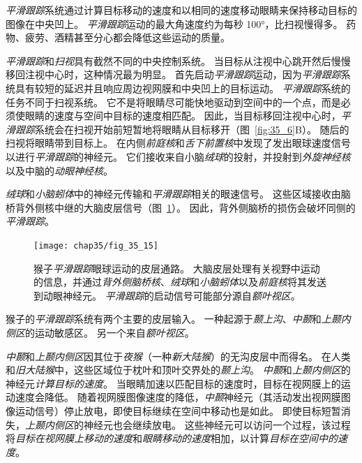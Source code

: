 \textit{平滑跟踪}系统通过计算目标移动的速度和以相同的速度移动眼睛来保持移动目标的图像在中央凹上。
\textit{平滑跟踪}运动的最大角速度约为每秒 100°，比扫视慢得多。
药物、疲劳、酒精甚至分心都会降低这些运动的质量。


\textit{平滑跟踪}和\textit{扫视}具有截然不同的中央控制系统。
当目标从注视中心跳开然后慢慢移回注视中心时，这种情况最为明显。
首先启动\textit{平滑跟踪}运动，因为\textit{平滑跟踪}系统具有较短的延迟并且响应周边视网膜和中央凹上的目标运动。
\textit{平滑跟踪}系统的任务不同于扫视系统。
它不是将眼睛尽可能快地驱动到空间中的一个点，而是必须使眼睛的速度与空间中目标的速度相匹配。
因此，当目标移回注视中心时，\textit{平滑跟踪}系统会在扫视开始前短暂地将眼睛从目标移开（图~\ref{fig:35_6}B）。
随后的扫视将眼睛带到目标上。
在内侧\textit{前庭核}和\textit{舌下前置核}中发现了发出眼球速度信号以进行\textit{平滑跟踪}的神经元。
它们接收来自小脑\textit{绒球}的投射，并投射到\textit{外旋神经核}以及中脑的\textit{动眼神经核}。


\textit{绒球}和\textit{小脑蚓体}中的神经元传输和\textit{平滑跟踪}相关的眼速信号。
这些区域接收由脑桥背外侧核中继的大脑皮层信号（图~\ref{fig:35_15}）。
因此，背外侧脑桥的损伤会破坏同侧的\textit{平滑跟踪}。


\begin{figure}[htbp]
	\centering
	\texttt{[image: chap35/fig\_35\_15]}
	\caption{猴子\textit{平滑跟踪}眼球运动的皮层通路。
		大脑皮层处理有关视野中运动的信息，并通过\textit{背外侧脑桥核}、\textit{绒球}和\textit{小脑蚓体}以及\textit{前庭核}将其发送到动眼神经元。
		\textit{平滑跟踪}的启动信号可能部分源自\textit{额叶视区}。}
	\label{fig:35_15}
\end{figure}


猴子的\textit{平滑跟踪}系统有两个主要的皮层输入。
一种起源于\textit{颞上沟}、\textit{中颞}和\textit{上颞内侧区}的运动敏感区。
另一个来自\textit{额叶视区}。


\textit{中颞}和\textit{上颞内侧区}因其位于\textit{夜猴}（一种\textit{新大陆猴}）的无沟皮层中而得名。
在人类和\textit{旧大陆猴}中，这些区域位于枕叶和顶叶交界处的\textit{颞上沟}。
\textit{中颞}和\textit{上颞内侧区}的神经元\textit{计算目标的速度}。
当眼睛加速以匹配目标的速度时，目标在视网膜上的运动速度会降低。
随着视网膜图像速度的降低，\textit{中颞}神经元（其活动发出视网膜图像运动信号）停止放电，即使目标继续在空间中移动也是如此。
即使目标短暂消失，\textit{上颞内侧区}的神经元也会继续放电。
这些神经元可以访问一个过程，该过程将\textit{目标在视网膜上移动的速度}和\textit{眼睛移动的速度}相加，以计算\textit{目标在空间中的速度}。


